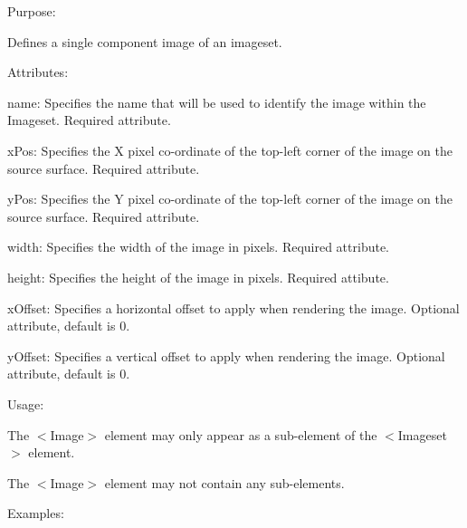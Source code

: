 \begin{DoxyItemize}
\item Purpose\+:
\begin{DoxyItemize}
\item Defines a single component image of an imageset.
\end{DoxyItemize}
\item Attributes\+:
\begin{DoxyItemize}
\item {\ttfamily name\+:} Specifies the name that will be used to identify the image within the Imageset. Required attribute.
\item {\ttfamily x\+Pos\+:} Specifies the X pixel co-\/ordinate of the top-\/left corner of the image on the source surface. Required attribute.
\item {\ttfamily y\+Pos\+:} Specifies the Y pixel co-\/ordinate of the top-\/left corner of the image on the source surface. Required attribute.
\item {\ttfamily width\+:} Specifies the width of the image in pixels. Required attribute.
\item {\ttfamily height\+:} Specifies the height of the image in pixels. Required attibute.
\item {\ttfamily x\+Offset\+:} Specifies a horizontal offset to apply when rendering the image. Optional attribute, default is 0.
\item {\ttfamily y\+Offset\+:} Specifies a vertical offset to apply when rendering the image. Optional attribute, default is 0.
\end{DoxyItemize}
\item Usage\+:
\begin{DoxyItemize}
\item The $<$Image$>$ element may only appear as a sub-\/element of the $<$Imageset$>$ element.
\item The $<$Image$>$ element may not contain any sub-\/elements.
\end{DoxyItemize}
\item Examples\+: 
\end{DoxyItemize}